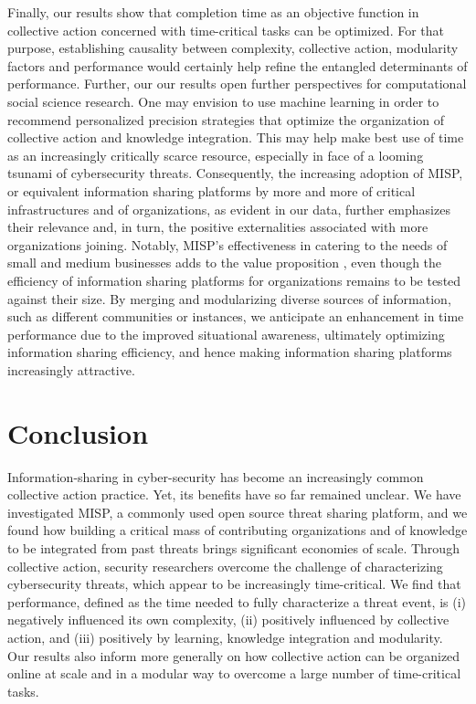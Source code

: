 \documentclass[unnumsec,webpdf,contemporary,large]{oup-authoring-template}%
\theoremstyle{thmstyleone}%
\theoremstyle{thmstyletwo}%
\theoremstyle{thmstylethree}%
\begin{document}
Finally, our results show that completion time as an objective function in collective action concerned with time-critical tasks can be optimized. For that purpose, establishing causality between complexity, collective action, modularity factors and performance would certainly help refine the entangled determinants of performance. Further, our our results open further perspectives for computational social science research. One may envision to use machine learning in order to recommend personalized precision strategies that optimize the organization of collective action and knowledge integration. This may help make best use of time as an increasingly critically scarce resource, especially in face of a looming tsunami of cybersecurity threats. Consequently, the increasing adoption of MISP, or equivalent information sharing platforms by more and more of critical infrastructures and of organizations, as evident in our data, further emphasizes their relevance and, in turn, the positive externalities associated with more organizations joining. Notably, MISP's effectiveness in catering to the needs of small and medium businesses adds to the value proposition {\cite{van2021shared}}, even though the efficiency of information sharing platforms for organizations remains to be tested against their size. By merging and modularizing diverse sources of information, such as different communities or instances, we anticipate an enhancement in time performance due to the improved situational awareness, ultimately optimizing information sharing efficiency, and hence making information sharing platforms increasingly attractive.

\section{Conclusion}
\label{sec:conclusion}
Information-sharing in cyber-security has become an increasingly common collective action practice. Yet, its benefits have so far remained unclear. We have investigated MISP, a commonly used open source threat sharing platform, and we found how building a critical mass of contributing organizations and of knowledge to be integrated from past threats brings significant economies of scale. Through collective action, security researchers overcome the challenge of characterizing cybersecurity threats, which appear to be increasingly time-critical. We find that performance, defined as the time needed to fully characterize a threat event, is (i) negatively influenced its own complexity, (ii) positively influenced by collective action, and (iii) positively by learning, knowledge integration and modularity. Our results also inform more generally on how collective action can be organized online at scale and in a modular way to overcome a large number of time-critical tasks.
\end{document}
